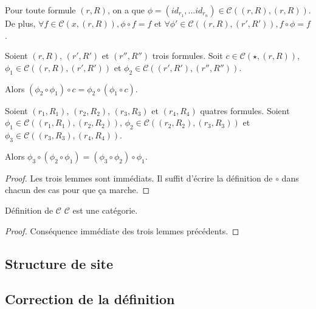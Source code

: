\documentclass[12pt]{article}
\renewcommand\C{\mathscr{C}}
\begin{document}
\begin{lem}
    Pour toute formule $(r,R)$, on a que
        $\phi=(id_{r_1},\dots id_{r_n})\in\C((r,R),(r,R))$.
    De plus, $\forall f\in\C(x, (r,R)), \phi\circ f = f$
    et $\forall \phi'\in\C((r,R), (r',R')), f\circ\phi = f$.
\end{lem}

\begin{lem}
    Soient $(r,R)$, $(r',R')$ et $(r'',R'')$ trois formules. Soit $c\in\C(\star,(r,R))$,
    $\phi_1\in\C((r,R), (r',R'))$ et $\phi_2\in\C((r',R'), (r'',R''))$.

    Alors $(\phi_2\circ\phi_1)\circ c = \phi_2\circ (\phi_1\circ c)$.
\end{lem}

\begin{lem}
    Soient $(r_1,R_1)$, $(r_2,R_2)$, $(r_3,R_3)$ et $(r_4,R_4)$ quatres formules.
    Soient $\phi_1\in\C((r_1,R_1), (r_2,R_2))$, $\phi_2\in\C((r_2,R_2), (r_3,R_3))$ et
    $\phi_3\in\C((r_3,R_3),(r_4,R_4))$.

    Alors $\phi_3\circ(\phi_2\circ\phi_1) = (\phi_3\circ\phi_2)\circ\phi_1$.
\end{lem}

\begin{proof} Les trois lemmes sont immédiats. Il suffit d'écrire la définition de $\circ$
    dans chacun des cas pour que ça marche.
\end{proof}

\begin{theo}{Définition de $\C$}
    $\C$ est une catégorie.
\end{theo}

\begin{proof} Conséquence immédiate des trois lemmes précédents.
\end{proof}
\subsection{Structure de site}



\subsection{Correction de la définition}

\end{document}

